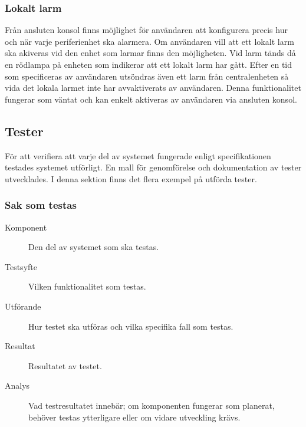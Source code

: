 \documentclass[a4paper]{article}
\begin{document}
\subsubsection{Lokalt larm}
Från ansluten konsol finns möjlighet för användaren att konfigurera precis hur och när varje periferienhet ska alarmera.
Om användaren vill att ett lokalt larm ska akiveras vid den enhet som larmar finns den möjligheten.
Vid larm tänds då en rödlampa på enheten som indikerar att ett lokalt larm har gått.
Efter en tid som specificeras av användaren utsöndras även ett larm från centralenheten så vida det lokala larmet inte har avvaktiverats av användaren.
Denna funktionalitet fungerar som väntat och kan enkelt aktiveras av användaren via ansluten konsol.

\subsection{Tester}
För att verifiera att varje del av systemet fungerade enligt specifikationen testades systemet utförligt. 
En mall för genomförelse och dokumentation av tester utvecklades. 
I denna sektion finns det flera exempel på utförda tester. 


\subsubsection{Sak som testas}
\begin{description}
\item[Komponent] Den del av systemet som ska testas.

\item[Testsyfte] Vilken funktionalitet som testas.

\item[Utförande] Hur testet ska utföras och vilka specifika fall som testas.

\item[Resultat] Resultatet av testet.

\item[Analys] Vad testresultatet innebär; om komponenten fungerar som planerat, behöver testas ytterligare eller om vidare utveckling krävs.
\end{description}
\end{document}
